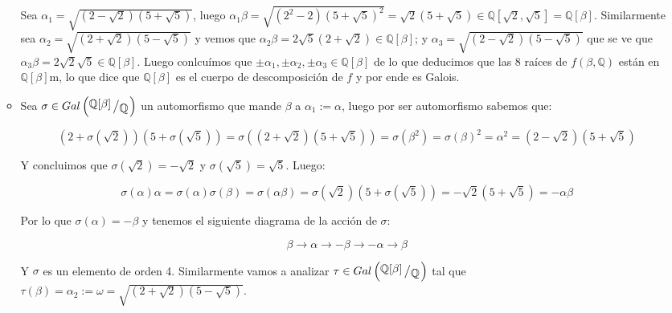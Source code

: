 \documentclass[11pt]{article}
\newcommand{\Q}{\mathbb{Q}}
\newcommand{\quotient}[2]{{\raisebox{.2em}{$#1$}\left/\raisebox{-.2em}{$#2$}\right.}}
\numberwithin{theorem}{subsection}
\begin{document}
\begin{enumerate}
\begin{itemize}
		Sea $\alpha_1 = \sqrt{\left(2 - \sqrt{2}\right) \left(5 +\sqrt{5}\right)}$, luego $\alpha_1\beta = \sqrt{\left(2^2 - 2\right)\left(5 + \sqrt{5}\right)^2} = \sqrt{2}\left(5 + \sqrt{5}\right) \in \Q[\sqrt{2}, \sqrt{5}] = \Q[\beta]$. Similarmente sea $\alpha_2 = \sqrt{\left(2 + \sqrt{2}\right) \left(5 -\sqrt{5}\right)}$ y vemos que $\alpha_2\beta = 2\sqrt{5}\left(2+\sqrt{2}\right) \in \Q[\beta]$; y $\alpha_3 = \sqrt{\left(2 - \sqrt{2}\right) \left(5 -\sqrt{5}\right)}$ que se ve que $\alpha_3\beta = 2\sqrt{2}\sqrt{5} \in \Q[\beta]$. Luego conlcu\'imos que $\pm \alpha_1, \pm \alpha_2, \pm \alpha_3 \in \Q[\beta]$ de lo que deducimos que las $8$ ra\'ices de $f\left(\beta, \Q\right)$ est\'an en $\Q[\beta]$m, lo que dice que $\Q[\beta]$ es el cuerpo de descomposici\'on de $f$ y por ende es Galois.
		
		\item Sea $\sigma \in Gal\left(\quotient{\Q[\beta]}{\Q}\right)$ un automorfismo que mande $\beta$ a $\alpha_1 := \alpha$, luego por ser automorfismo sabemos que:
		
		\begin{equation*}
			\left(2 + \sigma(\sqrt{2})\right)\left(5 + \sigma(\sqrt{5})\right) = \sigma\left(\left(2 + \sqrt{2}\right)\left(5 + \sqrt{5}\right)\right) = \sigma(\beta^2) = \sigma(\beta)^2 = \alpha^2 = \left(2 - \sqrt{2}\right) \left(5 +\sqrt{5}\right)
		\end{equation*}
		
		Y concluimos que $\sigma(\sqrt{2}) = -\sqrt{2}$ y $\sigma(\sqrt{5}) = \sqrt{5}$. Luego:
		
		\begin{equation*}
			\sigma(\alpha)\alpha = \sigma(\alpha)\sigma(\beta) = \sigma(\alpha \beta) = \sigma(\sqrt{2})(5 + \sigma(\sqrt{5})) = - \sqrt{2}(5 + \sqrt{5}) = -\alpha\beta
		\end{equation*}
		
		Por lo que $\sigma(\alpha)= -\beta$	y tenemos el siguiente diagrama de la acci\'on de $\sigma$:
		
		\begin{equation*}
			\beta \rightarrow \alpha \rightarrow - \beta \rightarrow - \alpha \rightarrow \beta
		\end{equation*}
		
		Y $\sigma$ es un elemento de orden 4. Similarmente vamos a analizar $\tau\in Gal\left(\quotient{\Q[\beta]}{\Q}\right)$ tal que $\tau(\beta) = \alpha_2:= \omega = \sqrt{\left(2 + \sqrt{2}\right) \left(5 -\sqrt{5}\right)}$.
		

\end{itemize}
\end{enumerate}
\end{document}
